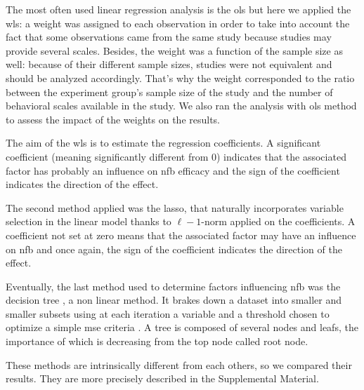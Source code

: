 The most often used linear regression analysis is the \gls{ols} but here we applied the \gls{wls}: a 
weight was assigned to each observation in order to take into account the fact that some observations came from the same study because studies 
may provide several scales. Besides, the weight was a function of the sample size as well: because of their different sample sizes,
studies were not equivalent and should be analyzed accordingly. That's why the weight corresponded to the ratio between the experiment group's sample size of the study and 
the number of behavioral scales available in the study. We also ran the analysis with \gls{ols} method to assess the impact of the weights on the results. 

The aim of the \gls{wls} is to estimate the regression coefficients. A significant coefficient (meaning significantly different from 0) indicates 
that the associated factor has probably an influence on \gls{nfb} efficacy and the sign of the coefficient indicates the direction of the effect.

The second method applied was the \gls{lasso}, that naturally incorporates variable selection 
in the linear model thanks to $\ell-1$-norm applied on the coefficients. A coefficient not set at zero means that 
the associated factor may have an influence on \gls{nfb} and once again, the sign of the coefficient indicates the direction of the effect.

Eventually, the last method used to determine factors influencing \gls{nfb} was the decision tree \citep{Quinlan1986}, a non linear method. It brakes down a dataset into smaller
and smaller subsets using at each iteration a variable and a threshold chosen to optimize a simple \gls{mse} criteria \citep{James2013}. A tree is composed of several 
nodes and leafs, the importance of which is decreasing from the top node called root node. 

These methods are intrinsically different from each others, so we compared their results. They are more precisely described in the Supplemental Material.
















